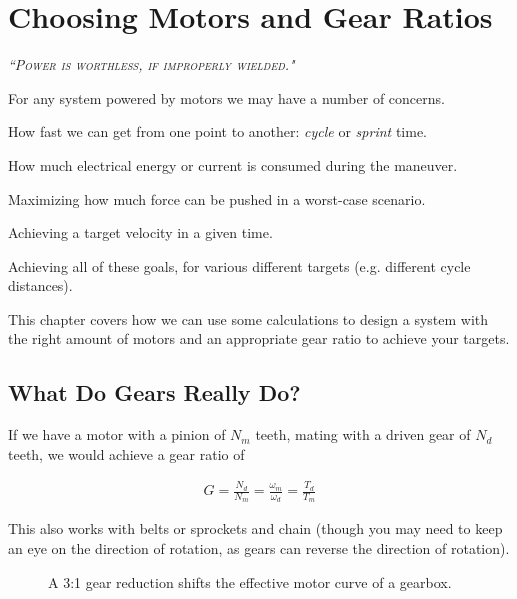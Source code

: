 \chapter{Choosing Motors and Gear Ratios}

 {\slshape \scshape ``Power is worthless, if improperly wielded."}
 
For any system powered by motors we may have a number of concerns.
\begin{asparaenum}[a)]
	\item How fast we can get from one point to another: \textit{cycle} or \textit{sprint} time.
	\item How much electrical energy or current is consumed during the maneuver.
	\item Maximizing how much force can be pushed in a worst-case scenario.
	\item Achieving a target velocity in a given time.
	\item Achieving all of these goals, for various different targets (e.g. different cycle distances).
\end{asparaenum}

This chapter covers how we can use some calculations to design a system with the right amount of motors and an appropriate gear ratio to achieve your targets.

\section{What Do Gears Really Do?}

If we have a motor with a pinion of $N_m$ teeth, mating with a driven gear of $N_d$ teeth, we would achieve a gear ratio of

\begin{align}
  G = \frac{N_d}{N_m} = \frac{\omega_m}{\omega_d} = \frac{T_d}{T_m}
\end{align}

This also works with belts or sprockets and chain (though you may need to keep an eye on the direction of rotation, as gears can reverse the direction of rotation).


\begin{figure}[H] \centering
{}
\caption{A 3:1 gear reduction shifts the effective motor curve of a gearbox.}
\end{figure}

